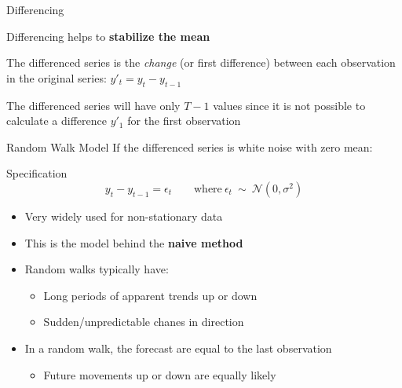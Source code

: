 \documentclass{beamer}
\newenvironment{wideitemize}{\itemize\addtolength{\itemsep}{10pt}}{\enditemize}
\begin{document}
\begin{frame}{Differencing}
  \begin{wideitemize}
  \item Differencing helps to \textbf{stabilize the mean}
  \item The differenced series is the \emph{change} (or first difference) between each observation in the original series: $y'_t = y_t - y_{t-1}$
  \item The differenced series will have only $T-1$ values since it is not possible to calculate a difference $y'_1$ for the first observation
  \end{wideitemize}

\end{frame}


\begin{frame}{Random Walk Model}
  If the differenced series is white noise with zero mean:
  \begin{block}{Specification}
    \begin{equation*}
      y_t - y_{t-1} = \epsilon_t \qquad \text{where} \ \epsilon_t \ \sim \ \mathcal{N}(0, \sigma^2)
    \end{equation*}
  \end{block}

  \begin{itemize}
  \item Very widely used for non-stationary data
  \item This is the model behind the \textbf{naive method}
  \item Random walks typically have:
    \begin{itemize}
    \item Long periods of apparent trends up or down
    \item Sudden/unpredictable chanes in direction
    \end{itemize}
  \item In a random walk, the forecast are equal to the last observation
    \begin{itemize}
    \item Future movements up or down are equally likely
    \end{itemize}
  \end{itemize}   
\end{frame}
\end{document}
